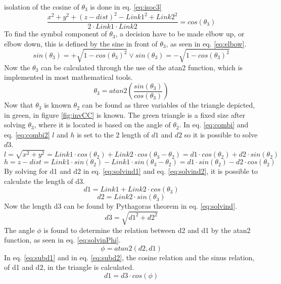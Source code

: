 isolation of the cosine of $\theta_3$ is done in eq. \ref{eq:isoc3}
\begin{equation}\label{eq:isoc3}
  \frac{x^2+y^2+(z - dist)^2-Link1^2+Link2^2}{2 \cdot Link1 \cdot Link2}=cos(\theta_3)
\end{equation}
To find the symbol component of $\theta_3$, a decision have to be made elbow up, or elbow down, this is defined by the sine in front of $\theta_3$, as seen in eq. \ref{eq:elbow}.
\begin{equation}\label{eq:elbow}
    sin(\theta_3)= +\sqrt{1-cos(\theta_3)^2} \vee sin(\theta_3)= -\sqrt{1-cos(\theta_3)^2}
\end{equation}
Now the $\theta_3$ can be calculated through the use of the atan2 function, which is implemented in most mathematical tools. 
\begin{equation}\label{eq:sTheta3}
    \theta_3 = atan2(\frac{sin(\theta_3)}{cos(\theta_3)})
\end{equation}
Now that $\theta_3$ is known $\theta_2$ can be found as three variables of the triangle depicted, in green, in figure \ref{fig:invCC} is known. The green triangle is a fixed size after solving $\theta_3$, where it is located is based on the angle of $\theta_2$. In eq. \ref{eq:combi} and eq. \ref{eq:combi2} $l$ and $h$ is set to the 2 length of $d1$ and $d2$ so it is possible to solve $d3$.
\begin{equation}\label{eq:combi}
    l = \sqrt{x^2+y^2} = Link1\cdot cos(\theta_2) + Link2\cdot cos(\theta_3 - \theta_2)=d1 \cdot cos(\theta_2)+d2 \cdot sin(\theta_2)
\end{equation}
\begin{equation}\label{eq:combi2}
    h = z - dist = Link1\cdot sin(\theta_2) - Link1\cdot sin(\theta_3 - \theta_2)=d1 \cdot sin(\theta_2)-d2 \cdot cos(\theta_2)
\end{equation}
By solving for d1 and d2 in eq. \ref{eq:solvind1} and eq. \ref{eq:solvind2}, it is possible to calculate the length of d3.
\begin{equation}\label{eq:solvind1}
    d1= Link1+  Link2\cdot cos(\theta_3)
\end{equation}
\begin{equation}\label{eq:solvind2}
    d2=Link2 \cdot sin(\theta_3)
\end{equation}
Now the length d3 can be found by Pythagoras theorem in eq. \ref{eq:solvind}.
\begin{equation}\label{eq:solvind}
    d3=\sqrt{d1^2+d2^2}
\end{equation}
The angle $\phi$ is found to determine the relation between d2 and d1 by the atan2 function, as seen in eq. \ref{eq:solvinPhi}.
\begin{equation}\label{eq:solvinPhi}
    \phi= atan2(d2,d1)
\end{equation}
In eq. \ref{eq:subd1} and in eq. \ref{eq:subd2}, the cosine relation and the sinus relation, of d1 and d2, in the triangle is calculated.
\begin{equation}\label{eq:subd1}
    d1=d3 \cdot cos(\phi)
\end{equation}

